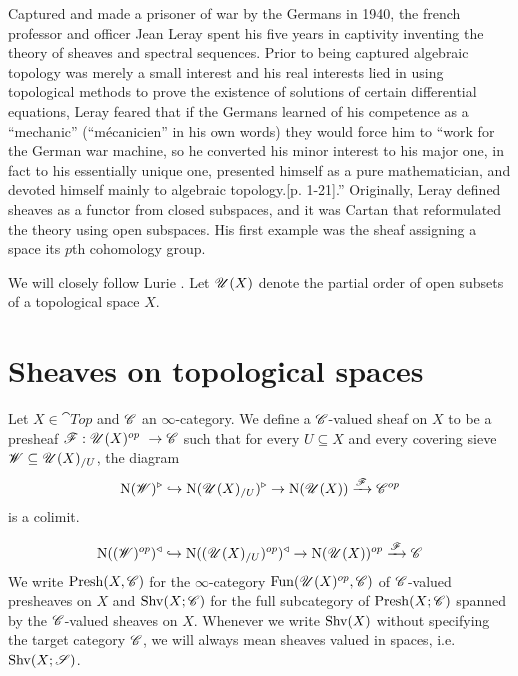 \documentclass[../../thesis.tex]{subfiles}
\begin{document}
Captured and made a prisoner of war by the Germans in 1940, the french professor and officer Jean Leray spent his five years in captivity inventing the theory of sheaves and spectral sequences.
Prior to being captured algebraic topology was merely a small interest and his real interests lied in using topological methods to prove the existence of solutions of certain differential equations, Leray feared that if the Germans learned of his competence as a ``mechanic'' (``mécanicien'' in his own words) they would force him to ``work for the German war machine, so he converted his minor interest to his major one, in fact to his essentially unique one, presented himself as a pure mathematician, and devoted himself mainly to algebraic topology.\cite{Borel}[p. 1-21].''
Originally, Leray defined sheaves as a functor from closed subspaces, and it was Cartan that reformulated the theory using open subspaces.\cite{H.Miller}
His first example was the sheaf assigning a space its $p$th cohomology group.

We will closely follow Lurie \cite{HTT}.
Let $\mathscr{U}(X)$ denote the partial order of open subsets of a topological space $X$.
\section{Sheaves on topological spaces}
\begin{definition}\label{sheaf_on_top}
    Let $X \in \cat{Top}$ and $\mathscr{C}$ an $\infty$-category.
    We define a $\mathscr{C}$-valued sheaf on $X$ to be a presheaf $\F: \Open(X)^{op} \to \C$ such that for every $U\subseteq X$ and every covering sieve $\mathscr{W} \subseteq \mathscr{U}(X)_{/U}$, the diagram
    \[
        \mathrm{N}(\mathscr{W})^{\triangleright} \hookrightarrow \mathrm{N}(\mathscr{U}(X)_{/U})^{\triangleright} \rightarrow \mathrm{N}(\mathscr{U}(X))\xrightarrow{\mathscr{F}}\mathscr{C}^{op}
    \]
    is a colimit.
\end{definition}
\[
    \mathrm{N}((\mathscr{W})^{op})^{\triangleleft} \hookrightarrow \mathrm{N}((\mathscr{U}(X)_{/U})^{op})^{\triangleleft} \rightarrow \mathrm{N}(\mathscr{U}(X))^{op}\xrightarrow{\mathscr{F}}\mathscr{C}
\]
We write $\mathrm{Presh}(X, \mathscr{C})$ for the $\infty$-category $\mathrm{Fun}(\mathscr{U}(X)^{op}, \mathscr{C})$ of $\mathscr{C}$-valued presheaves on $X$ and $\mathrm{Shv}(X;\mathscr{C})$ for the full subcategory of $\mathrm{Presh}(X;\mathscr{C})$ spanned by the $\mathscr{C}$-valued sheaves on $X$.
Whenever we write $\mathrm{Shv}(X)$ without specifying the target category $\mathscr{C}$, we will always mean sheaves valued in spaces, i.e. $\mathrm{Shv}(X;\mathscr{S})$.
\end{document}
